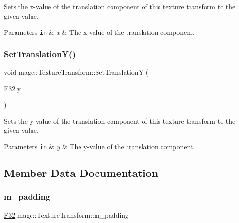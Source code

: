 Sets the x-\/value of the translation component of this texture transform to the given value.


\begin{DoxyParams}[1]{Parameters}
\mbox{\tt in}  & {\em x} & The x-\/value of the translation component. \\
\hline
\end{DoxyParams}
\mbox{\label{classmage_1_1_texture_transform_a3c8d11ee771bab59e7960c616ff7261e}} 
\subsubsection{\texorpdfstring{Set\+Translation\+Y()}{SetTranslationY()}}
{\footnotesize\ttfamily void mage\+::\+Texture\+Transform\+::\+Set\+TranslationY (\begin{DoxyParamCaption}\item[{\mbox{\hyperlink{namespacemage_aa97e833b45f06d60a0a9c4fc22ae02c0}{F32}}}]{y }\end{DoxyParamCaption})\hspace{0.3cm}{\ttfamily [noexcept]}}

Sets the y-\/value of the translation component of this texture transform to the given value.


\begin{DoxyParams}[1]{Parameters}
\mbox{\tt in}  & {\em y} & The y-\/value of the translation component. \\
\hline
\end{DoxyParams}


\subsection{Member Data Documentation}
\mbox{\label{classmage_1_1_texture_transform_a49845212aa6b85f73f9ca2101748bb13}} 
\subsubsection{\texorpdfstring{m\+\_\+padding}{m\_padding}}
{\footnotesize\ttfamily \mbox{\hyperlink{namespacemage_aa97e833b45f06d60a0a9c4fc22ae02c0}{F32}} mage\+::\+Texture\+Transform\+::m\+\_\+padding\hspace{0.3cm}{\ttfamily [private]}}

